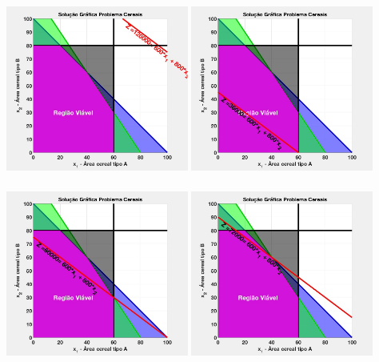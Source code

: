 \documentclass{beamer}
\begin{document}
\begin{frame}
\begin{columns}
\begin{column}{0.5\textwidth}
			\only<17> {\includegraphics[width=6cm,height=6cm]{MatLab/anima_14.png} }
			\only<18> {\includegraphics[width=6cm,height=6cm]{MatLab/anima_15.png} }
			\only<19> {\includegraphics[width=6cm,height=6cm]{MatLab/anima_16.png} }
			\only<20> {\includegraphics[width=6cm,height=6cm]{MatLab/anima_17.png} }

\end{column}
\end{columns}
\end{frame}
\end{document}
